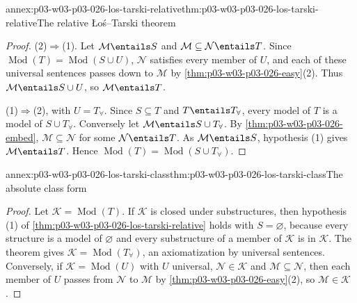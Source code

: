 \begin{annexitem}{annex:p03-w03-p03-026-los-tarski-relative}{thm:p03-w03-p03-026-los-tarski-relative}{The relative \L o\'s--Tarski theorem}
\begin{proof}
(2)\(\Rightarrow\)(1).  Let \(\mathcal M\entails S\) and
\(\mathcal M\subseteq\mathcal N\entails T\).  Since
\(\operatorname{Mod}(T)=\operatorname{Mod}(S\cup U)\), \(\mathcal N\)
satisfies every member of \(U\), and each of these universal sentences
passes down to \(\mathcal M\) by \cref{thm:p03-w03-p03-026-easy}(2).  Thus
\(\mathcal M\entails S\cup U\), so \(\mathcal M\entails T\).

(1)\(\Rightarrow\)(2), with \(U=T_{\forall}\).  Since \(S\subseteq T\) and
\(T\entails T_{\forall}\), every model of \(T\) is a model of
\(S\cup T_{\forall}\).  Conversely let \(\mathcal M\entails S\cup T_{\forall}\).
By \cref{thm:p03-w03-p03-026-embed}, \(\mathcal M\subseteq\mathcal N\) for
some \(\mathcal N\entails T\).  As \(\mathcal M\entails S\), hypothesis (1)
gives \(\mathcal M\entails T\).  Hence
\(\operatorname{Mod}(T)=\operatorname{Mod}(S\cup T_{\forall})\).
\end{proof}
\end{annexitem}

\begin{annexitem}{annex:p03-w03-p03-026-los-tarski-class}{thm:p03-w03-p03-026-los-tarski-class}{The absolute class form}
\begin{proof}
Let \(\mathcal K=\operatorname{Mod}(T)\).  If \(\mathcal K\) is closed under
substructures, then hypothesis (1) of
\cref{thm:p03-w03-p03-026-los-tarski-relative} holds with
\(S=\varnothing\), because every structure is a model of \(\varnothing\) and
every substructure of a member of \(\mathcal K\) is in \(\mathcal K\).  The
theorem gives \(\mathcal K=\operatorname{Mod}(T_{\forall})\), an
axiomatization by universal sentences.  Conversely, if
\(\mathcal K=\operatorname{Mod}(U)\) with \(U\) universal,
\(\mathcal N\in\mathcal K\) and \(\mathcal M\subseteq\mathcal N\), then each
member of \(U\) passes from \(\mathcal N\) to \(\mathcal M\) by
\cref{thm:p03-w03-p03-026-easy}(2), so \(\mathcal M\in\mathcal K\).
\end{proof}
\end{annexitem}

